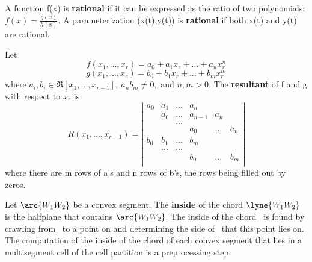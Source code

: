 A function f(x) is {\bf rational} if it can be expressed as 
the ratio of two polynomials: $f(x) = \frac{g(x)}{h(x)}$.
A parameterization (x(t),y(t)) is {\bf rational} if both x(t) and
y(t) are rational.

Let \[ f(x_{1},\ldots,x_{r}) = a_{0} + a_{1}x_{r} + \ldots + a_{n}x_{r}^{n} \]
    \[ g(x_{1},\ldots,x_{r}) = b_{0} + b_{1}x_{r} + \ldots + b_{m}x_{r}^{m} \]
where $a_{i},b_{i} \in \Re[x_{1},\ldots,x_{r-1}],\ a_{n}b_{m} \neq 0, 
\mbox{ and } n,m > 0$.
The {\bf resultant} of f and g with respect to $x_{r}$ is 
%
\[ R(x_{1},\ldots,x_{r-1}) = \left| \begin{array}{cccccc}
a_{0} & a_{1} & \ldots & a_{n} \\
      & a_{0} & \ldots & a_{n-1} & a_{n} \\
      &       &	\ldots \\
      &       &        & a_{0} & \ldots & a_{n} \\
b_{0} & b_{1} & \ldots & b_{m} \\
      & \ldots& \ldots \\
      &       &        & b_{0}  & \ldots & b_{m} \\
\end{array} \right| \]
%
where there are m rows of a's and n rows of b's, the rows being filled out by 
zeros.

Let $\arc{W_{1}W_{2}}$ be a convex segment.
The {\bf inside} of the chord $\lyne{W_{1}W_{2}}$ is the halfplane that
contains $\arc{W_{1}W_{2}}$.
The inside of the chord \lyne{\wo\wt}\ is found by crawling from \wo\ to
a point on \arc{\wo\wt}
and determining the side of \lyne{\wo\wt}\ that this point lies on.
The computation of the inside of the chord of each convex segment that
lies in a multisegment cell of the cell partition is 
a preprocessing step.
